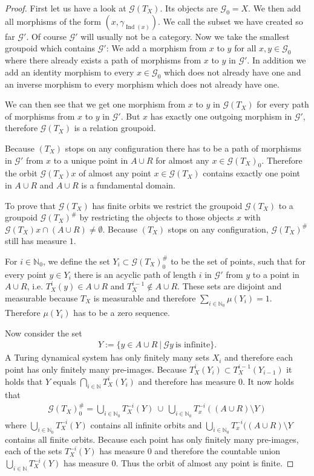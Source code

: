 \documentclass[12pt,a4paper]{scrartcl}
\theoremstyle{plain}
\theoremstyle{definition}
\newcommand{\N}{\mathbb{N}} %
\newcommand{\2}{\mathbb{Z} / 2 \mathbb{Z}}
\newcommand{\G}{\mathcal{G}}
\newcommand{\1}{\bar{1}}
\newcommand{\0}{\bar{0}}
\newcommand{\Ind}{\operatorname{Ind}}
\begin{document}
\begin{proof}
	First let us have a look at $\G (T_X)$. Its objects are $\G_0 = X$. We then add all morphisms of the form $(x, \gamma_{\Ind(x)})$. We call the subset we have created so far $\G'$. Of course $\G'$ will usually not be a category. Now we take the smallest groupoid which contains $\G'$: We add a morphism from $x$ to $y$ for all $x, y \in \G_0$ where there already exists a path of morphisms from $x$ to $y$ in $\G'$. In addition we add an identity morphism to every $ x\in \G_0$ which does not already have one and an inverse morphism to every morphism which does not already have one. 
	
	We can then see that we get one morphism from $x$ to $y$ in $\G (T_X)$ for every path of morphisms from $x$ to $y$ in $\G'$. But $x$ has exactly one outgoing morphism in $\G'$, therefore $\G (T_X)$ is a relation groupoid.

	Because $(T_X)$ stops on any configuration there has to be a path of morphisms in $\G'$ from $x$ to a unique point in $A \cup R$ for almost any $x \in \G (T_X)_0$. Therefore the orbit $\G (T_X)x$ of almost any point $x \in \G (T_X)$ contains exactly one point in $A \cup R$ and $A \cup R$ is a fundamental domain.
	
	To prove that $\G (T_X)$ has finite orbits we restrict the groupoid $\G (T_X)$ to a groupoid $\G (T_X)^\#$ by restricting the objects to those objects $x$ with $\G (T_X)x \cap (A \cup R) \neq \emptyset$. Because $(T_X)$ stops on any configuration, $\G (T_X)^\#$ still has measure $1$.
	
	For $i \in \N_0$, we define the set $Y_i \subset \G (T_X)_0^\#$ to be the set of points, such that for every point $y \in Y_i$ there is an acyclic path of length $i$ in $\G'$ from $y$ to a point in $A \cup R$, i.e. $T_X^i(y) \in A \cup R$ and $T_X^{i-1} \notin A \cup R$. These sets are disjoint and measurable because $T_X$ is measurable and therefore $\sum_{i \in \N_0} \mu(Y_i) = 1$. Therefore $\mu(Y_i)$ has to be a zero sequence.
	
	Now consider the set 
	\begin{align*}
		Y := \{y \in A \cup R ~|~ \G y ~ \text{is infinite}\}. 
	\end{align*}
	A Turing dynamical system has only finitely many sets $X_i$ and therefore each point has only finitely many pre-images. Because $T_X^i(Y_i) \subset T_X^{i-1}(Y_{i-1})$ it holds that $Y$ equals $\bigcap_{i \in \N} T_X^i(Y_i)$ and therefore has measure $0$. It now holds that 
	\begin{align*}
		\G (T_X)_0^\# =\bigcup_{i \in \N_0 }T_X^{-i}(Y) ~\cup~ \bigcup_{i \in \N_0 }T_x^{-i}((A\cup R) \setminus Y)
	\end{align*}
	where $\bigcup_{i \in \N_0 }T_X^{-i}(Y)$ contains all infinite orbits and $\bigcup_{i \in \N_0 }T_x^{-i}((A\cup R) \setminus Y$ contains all finite orbits. Because each point has only finitely many pre-images, each of the sets $T_X^{-i}(Y)$ has measure $0$ and therefore the countable union $\bigcup_{i \in \N }T_X^{-i}(Y)$ has measure $0$. Thus the orbit of almost any point is finite. 
\end{proof} 
\end{document}
